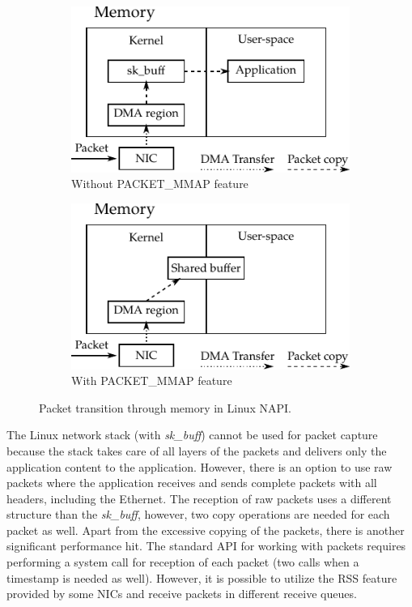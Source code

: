 \begin{figure}[!tb]
    \centering
    \begin{subfigure}[t]{0.5\textwidth}
        \includegraphics{figures/NAPI}
        \caption{Without PACKET\_MMAP feature}
        \label{fig:NAPI_no_MMAP}
    \end{subfigure}%
    \begin{subfigure}[t]{0.5\textwidth}
        \includegraphics{figures/NAPI_MMAP}
        \caption{With PACKET\_MMAP feature}
        \label{fig:NAPI_MMAP}
    \end{subfigure}
    \caption{Packet transition through memory in Linux NAPI.}
    \label{fig:NAPI}
\end{figure}

The Linux network stack (with \emph{sk\_buff}) cannot be used for packet capture because the stack takes care of all layers of the packets and delivers only the application content to the application. However, there is an option to use raw packets where the application receives and sends complete packets with all headers, including the Ethernet. The reception of raw packets uses a different structure than the \emph{sk\_buff}, however, two copy operations are needed for each packet as well. Apart from the excessive copying of the packets, there is another significant performance hit. The standard API for working with packets requires performing a system call for reception of each packet (two calls when a timestamp is needed as well). However, it is possible to utilize the RSS feature provided by some NICs and receive packets in different receive queues.

